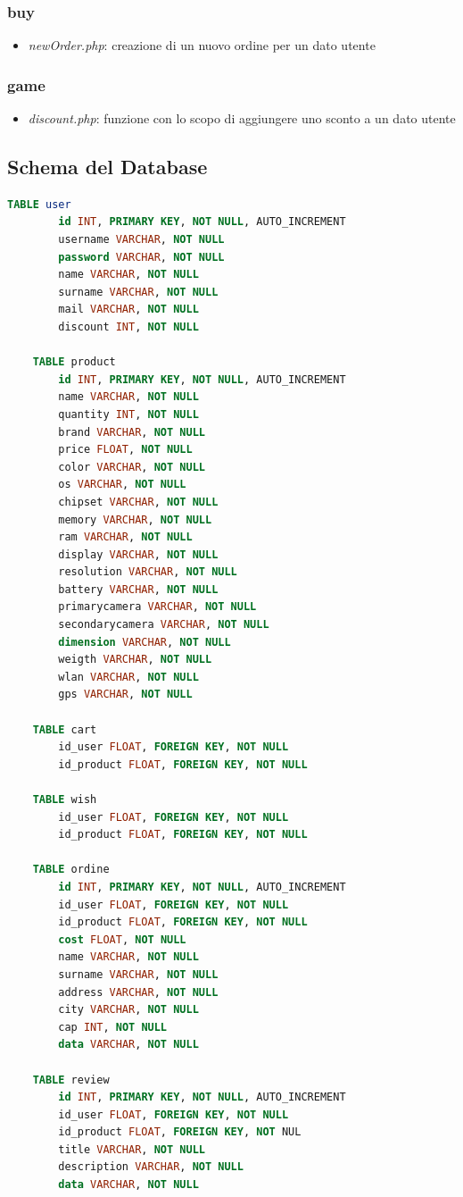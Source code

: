 \documentclass[14pt]{extarticle}
\begin{document}
\subsubsection*{buy}
\begin{itemize}
    \item \textit{newOrder.php}: creazione di un nuovo ordine per un dato utente
\end{itemize}

\subsubsection*{game}
\begin{itemize}
    \item  \textit{discount.php}: funzione con lo scopo di aggiungere uno sconto a un dato utente
\end{itemize}

\FloatBarrier
\subsection{Schema del Database}
\begin{lstlisting}[language=SQL]
    TABLE user
        id INT, PRIMARY KEY, NOT NULL, AUTO_INCREMENT
        username VARCHAR, NOT NULL
        password VARCHAR, NOT NULL
        name VARCHAR, NOT NULL
        surname VARCHAR, NOT NULL
        mail VARCHAR, NOT NULL
        discount INT, NOT NULL
    
    TABLE product
        id INT, PRIMARY KEY, NOT NULL, AUTO_INCREMENT
        name VARCHAR, NOT NULL
        quantity INT, NOT NULL
        brand VARCHAR, NOT NULL
        price FLOAT, NOT NULL
        color VARCHAR, NOT NULL
        os VARCHAR, NOT NULL
        chipset VARCHAR, NOT NULL
        memory VARCHAR, NOT NULL
        ram VARCHAR, NOT NULL
        display VARCHAR, NOT NULL
        resolution VARCHAR, NOT NULL
        battery VARCHAR, NOT NULL
        primarycamera VARCHAR, NOT NULL
        secondarycamera VARCHAR, NOT NULL
        dimension VARCHAR, NOT NULL
        weigth VARCHAR, NOT NULL
        wlan VARCHAR, NOT NULL
        gps VARCHAR, NOT NULL
    
    TABLE cart
        id_user FLOAT, FOREIGN KEY, NOT NULL
        id_product FLOAT, FOREIGN KEY, NOT NULL
    
    TABLE wish
        id_user FLOAT, FOREIGN KEY, NOT NULL
        id_product FLOAT, FOREIGN KEY, NOT NULL
    
    TABLE ordine
        id INT, PRIMARY KEY, NOT NULL, AUTO_INCREMENT
        id_user FLOAT, FOREIGN KEY, NOT NULL
        id_product FLOAT, FOREIGN KEY, NOT NULL
        cost FLOAT, NOT NULL
        name VARCHAR, NOT NULL
        surname VARCHAR, NOT NULL
        address VARCHAR, NOT NULL
        city VARCHAR, NOT NULL
        cap INT, NOT NULL
        data VARCHAR, NOT NULL
    
    TABLE review
        id INT, PRIMARY KEY, NOT NULL, AUTO_INCREMENT
        id_user FLOAT, FOREIGN KEY, NOT NULL
        id_product FLOAT, FOREIGN KEY, NOT NUL
        title VARCHAR, NOT NULL
        description VARCHAR, NOT NULL
        data VARCHAR, NOT NULL
\end{lstlisting}
\end{document}
